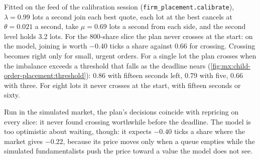 Fitted on the feed of the calibration session (\texttt{firm\_placement.calibrate}), $\lambda=0.99$ lots a second join each best quote, each lot at the
best cancels at $\theta=0.021$ a second,  take $\mu=0.69$ lots a second from each side, and the second level holds 3.2 lots. For the
800-share slice the plan never crosses at the start: on the model, joining is worth $-0.40$ ticks a share against 0.66 for crossing. Crossing becomes
right only for small, urgent orders. For a single lot the plan crosses when the imbalance exceeds a threshold that falls as the deadline nears
(\cref{fig:mx:child-order-placement:threshold}): 0.86 with fifteen seconds left, 0.79 with five, 0.66 with three. For eight lots it never crosses
at the start, with fifteen seconds or sixty.

\begin{omfigure}

\label{fig:mx:child-order-placement:threshold}
\end{omfigure}

\label{lst:mx:child-order-placement:policy}

Run in the simulated market, the plan's decisions coincide with repricing on every slice: it never found crossing worthwhile before the deadline.
The model is too optimistic about waiting, though: it expects $-0.40$ ticks a share where the market gives $-0.22$, because its price moves only
when a queue empties while the simulated fundamentalists push the price toward a value the model does not see.

